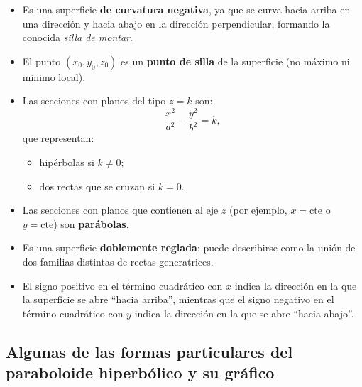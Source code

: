 \documentclass[11pt]{article}
\begin{document}
\begin{itemize}
    \item Es una superficie \textbf{de curvatura negativa}, ya que se curva hacia arriba en una dirección  y hacia abajo en la dirección perpendicular, formando la conocida \emph{silla de montar}.
    
    \item El punto $(x_0,y_0,z_0)$ es un \textbf{punto de silla} de la superficie (no máximo ni mínimo local).

    \item Las secciones con planos del tipo $z = k$ son:
    \[
    \frac{x^{2}}{a^{2}} - \frac{y^{2}}{b^{2}} = k,
    \]
    que representan:
    \begin{itemize}
        \item hipérbolas si $k\neq 0$;
        \item dos rectas que se cruzan si $k=0$.
    \end{itemize}

    \item Las secciones con planos que contienen al eje $z$ (por ejemplo, $x=\text{cte}$ o $y=\text{cte}$)
    son \textbf{parábolas}.

    \item Es una superficie \textbf{doblemente reglada}: puede describirse como la unión de dos familias
    distintas de rectas generatrices.

    \item El signo positivo en el término cuadrático con $x$ indica la dirección en la que la superficie
    se abre ``hacia arriba'', mientras que el signo negativo en el término cuadrático con $y$
    indica la dirección en la que se abre ``hacia abajo''.
\end{itemize}








\subsection*{Algunas de las formas particulares del paraboloide hiperbólico y su gráfico}
\end{document}
